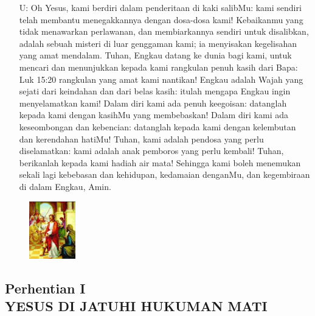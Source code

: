 \documentclass[a5paper,headsepline,titlepage,10pt,nnormalheadings,DIVcalc]{scrbook}
\newcommand{\BU}[1]{\begin{itemize} \item[U:] #1 \end{itemize}}
\begin{document}
\BU{Oh Yesus, kami berdiri dalam penderitaan di kaki salibMu: kami sendiri telah membantu menegakkannya dengan dosa-dosa kami! Kebaikanmu yang tidak menawarkan perlawanan, dan membiarkannya sendiri untuk disalibkan, adalah sebuah misteri di luar genggaman kami; ia menyisakan kegelisahan yang amat mendalam. Tuhan, Engkau datang ke dunia bagi kami, untuk mencari dan menunjukkan kepada kami rangkulan penuh kasih dari Bapa:
 Luk 15:20 rangkulan yang amat kami nantikan! Engkau adalah Wajah yang sejati dari keindahan dan dari belas kasih: itulah mengapa Engkau ingin menyelamatkan kami! Dalam diri kami ada penuh keegoisan: datanglah kepada kami dengan kasihMu yang membebaskan! Dalam diri kami ada keseombongan dan kebencian: datanglah kepada kami dengan kelembutan dan kerendahan hatiMu! Tuhan, kami adalah pendosa yang perlu diselamatkan: kami adalah anak pemboros yang perlu kembali! Tuhan, berikanlah kepada kami hadiah air mata! Sehingga kami boleh menemukan sekali lagi kebebasan dan kehidupan, kedamaian denganMu, dan kegembiraan di dalam Engkau, Amin.} 


\begin{figure}
\includegraphics[width=2cm]{jalansalib_files/01_small.jpg}
\end{figure}
\subsection*{Perhentian I \\
YESUS DI JATUHI HUKUMAN MATI}
\end{document}
